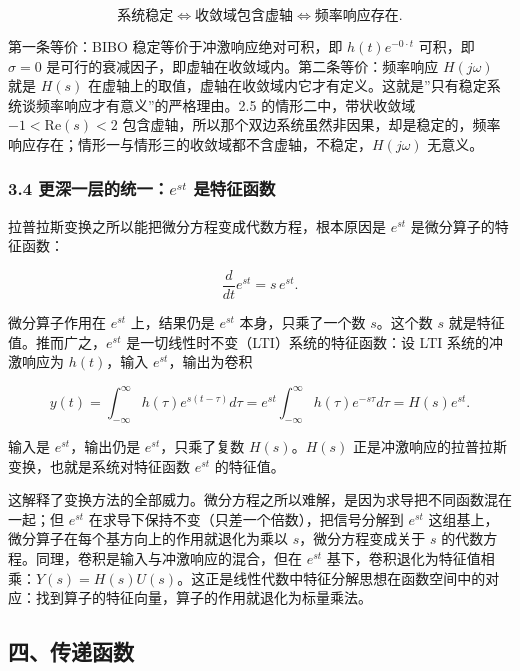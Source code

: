 \documentclass[12pt]{ctexart}
\begin{document}
\[
\text{系统稳定}\iff\text{收敛域包含虚轴}\iff\text{频率响应存在}.
\]

第一条等价：BIBO 稳定等价于冲激响应绝对可积，即 \(h(t)e^{-0\cdot t}\)
可积，即 \(\sigma=0\)
是可行的衰减因子，即虚轴在收敛域内。第二条等价：频率响应 \(H(j\omega)\)
就是 \(H(s)\)
在虚轴上的取值，虚轴在收敛域内它才有定义。这就是''只有稳定系统谈频率响应才有意义''的严格理由。2.5
的情形二中，带状收敛域 \(-1<\mathrm{Re}(s)<2\)
包含虚轴，所以那个双边系统虽然非因果，却是稳定的，频率响应存在；情形一与情形三的收敛域都不含虚轴，不稳定，\(H(j\omega)\)
无意义。

\hypertarget{ux66f4ux6df1ux4e00ux5c42ux7684ux7edfux4e00est-ux662fux7279ux5f81ux51fdux6570}{%
\subsubsection{\texorpdfstring{3.4 更深一层的统一：\(e^{st}\)
是特征函数}{3.4 更深一层的统一：e\^{}\{st\} 是特征函数}}\label{ux66f4ux6df1ux4e00ux5c42ux7684ux7edfux4e00est-ux662fux7279ux5f81ux51fdux6570}}

拉普拉斯变换之所以能把微分方程变成代数方程，根本原因是 \(e^{st}\)
是微分算子的特征函数：

\[
\frac{d}{dt}e^{st}=s\,e^{st}.
\]

微分算子作用在 \(e^{st}\) 上，结果仍是 \(e^{st}\) 本身，只乘了一个数
\(s\)。这个数 \(s\) 就是特征值。推而广之，\(e^{st}\)
是一切线性时不变（LTI）系统的特征函数：设 LTI 系统的冲激响应为
\(h(t)\)，输入 \(e^{st}\)，输出为卷积

\[
y(t)=\int_{-\infty}^{\infty}h(\tau)e^{s(t-\tau)}d\tau=e^{st}\int_{-\infty}^{\infty}h(\tau)e^{-s\tau}d\tau=H(s)e^{st}.
\]

输入是 \(e^{st}\)，输出仍是 \(e^{st}\)，只乘了复数 \(H(s)\)。\(H(s)\)
正是冲激响应的拉普拉斯变换，也就是系统对特征函数 \(e^{st}\) 的特征值。

这解释了变换方法的全部威力。微分方程之所以难解，是因为求导把不同函数混在一起；但
\(e^{st}\) 在求导下保持不变（只差一个倍数），把信号分解到 \(e^{st}\)
这组基上，微分算子在每个基方向上的作用就退化为乘以
\(s\)，微分方程变成关于 \(s\)
的代数方程。同理，卷积是输入与冲激响应的混合，但在 \(e^{st}\)
基下，卷积退化为特征值相乘：\(Y(s)=H(s)U(s)\)。这正是线性代数中特征分解思想在函数空间中的对应：找到算子的特征向量，算子的作用就退化为标量乘法。

\hypertarget{ux56dbux4f20ux9012ux51fdux6570}{%
\subsection{四、传递函数}\label{ux56dbux4f20ux9012ux51fdux6570}}
\end{document}
